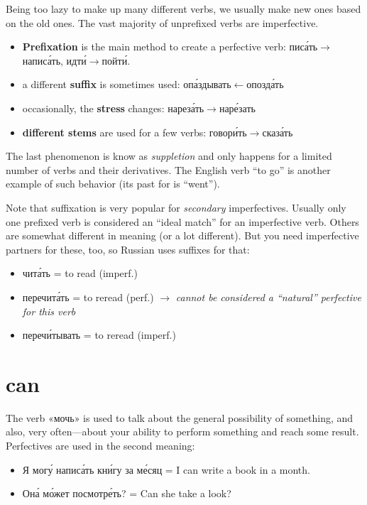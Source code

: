 Being too lazy to make up many different verbs, we usually make new ones
based on the old ones. The vast majority of unprefixed verbs are
imperfective.

\begin{itemize}
\tightlist
\item
  \textbf{Prefixation} is the main method to create a perfective verb:
  пис\'{а}ть$ \rightarrow$напис\'{а}ть, идт\'{и}$ \rightarrow$пойт\'{и}.
\item
  a different \textbf{suffix} is sometimes used: оп\'{а}здывать$ \leftarrow$опозд\'{а}ть
\item
  occasionally, the \textbf{stress} changes: нарез\'{а}ть$ \rightarrow$нар\'{е}зать
\item
  \textbf{different stems} are used for a few verbs: говор\'{и}ть$ \rightarrow$сказ\'{а}ть
\end{itemize}

The last phenomenon is know as \emph{suppletion} and only happens for a
limited number of verbs and their derivatives. The English verb ``to
go'' is another example of such behavior (its past for is ``went'').

Note that suffixation is very popular for \emph{secondary}
imperfectives. Usually only one prefixed verb is considered an ``ideal
match'' for an imperfective verb. Others are somewhat different in
meaning (or a lot different). But you need imperfective partners for
these, too, so Russian uses suffixes for that:

\begin{itemize}
\tightlist
\item
  чит\'{а}ть = to read (imperf.)
\item
  перечит\'{а}ть = to reread (perf.) $ \rightarrow$ \emph{cannot be considered a
  ``natural'' perfective for this verb}
\item
  переч\'{и}тывать = to reread (imperf.)
\end{itemize}

\section{can}\label{can}

The verb «мочь» is used to talk about the general possibility of
something, and also, very often---about your ability to perform
something and reach some result. Perfectives are used in the second
meaning:

\begin{itemize}
\tightlist
\item
  Я мог\'{у} напис\'{а}ть кн\'{и}гу за м\'{е}сяц = I can write a book in a month.
\item
  Он\'{а} м\'{о}жет посмотр\'{е}ть? = Can she take a look?
\end{itemize}

